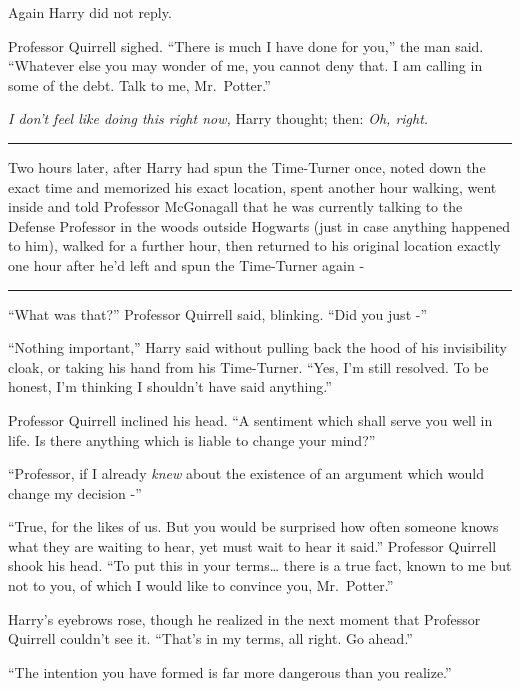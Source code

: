 Again Harry did not reply.

Professor Quirrell sighed. ``There is much I have done for you,'' the
man said. ``Whatever else you may wonder of me, you cannot deny that. I
am calling in some of the debt. Talk to me, Mr.~Potter.''

\emph{I don't feel like doing this right now,} Harry thought; then:
\emph{Oh, right.}

\begin{center}\rule{3in}{0.4pt}\end{center}

Two hours later, after Harry had spun the Time-Turner once, noted down
the exact time and memorized his exact location, spent another hour
walking, went inside and told Professor McGonagall that he was currently
talking to the Defense Professor in the woods outside Hogwarts (just in
case anything happened to him), walked for a further hour, then returned
to his original location exactly one hour after he'd left and spun the
Time-Turner again -

\begin{center}\rule{3in}{0.4pt}\end{center}

``What was that?'' Professor Quirrell said, blinking. ``Did you just -''

``Nothing important,'' Harry said without pulling back the hood of his
invisibility cloak, or taking his hand from his Time-Turner. ``Yes, I'm
still resolved. To be honest, I'm thinking I shouldn't have said
anything.''

Professor Quirrell inclined his head. ``A sentiment which shall serve
you well in life. Is there anything which is liable to change your
mind?''

``Professor, if I already \emph{knew} about the existence of an argument
which would change my decision -''

``True, for the likes of us. But you would be surprised how often
someone knows what they are waiting to hear, yet must wait to hear it
said.'' Professor Quirrell shook his head. ``To put this in your
terms\ldots{} there is a true fact, known to me but not to you, of which
I would like to convince you, Mr.~Potter.''

Harry's eyebrows rose, though he realized in the next moment that
Professor Quirrell couldn't see it. ``That's in my terms, all right. Go
ahead.''

``The intention you have formed is far more dangerous than you
realize.''

